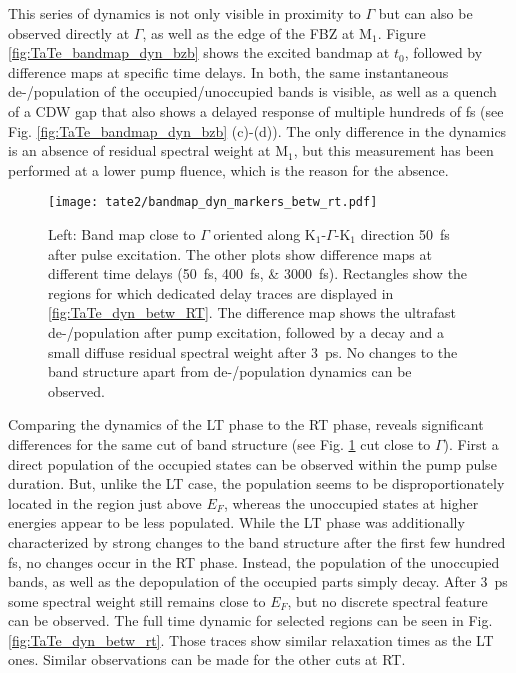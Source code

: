 This series of dynamics is not only visible in proximity to $\Gamma$ but can also be observed directly at $\Gamma$, as well as the edge of the FBZ at M$_1$.
Figure \ref{fig:TaTe_bandmap_dyn_bzb} shows the excited bandmap at $t_0$, followed by difference maps at specific time delays.
In both, the same instantaneous de-/population of the occupied/unoccupied bands is visible, as well as a quench of a CDW gap that also shows a delayed response of multiple hundreds of \si{\femto\second} (see Fig. \ref{fig:TaTe_bandmap_dyn_bzb} (c)-(d)).
The only difference in the dynamics is an absence of residual spectral weight at M$_1$, but this measurement has been performed at a lower pump fluence, which is the reason for the absence.

\begin{figure}[t!]
	\centering
	\texttt{[image: tate2/bandmap\_dyn\_markers\_betw\_rt.pdf]}
	\caption{Left: Band map close to $\Gamma$ oriented along K$_1$-$\Gamma$-K$_1$ direction \SI{50}{\femto\second} after pulse excitation. The other plots show difference maps at different time delays (\SIlist{50;400;3000}{\femto\second}). Rectangles show the regions for which dedicated delay traces are displayed in \ref{fig:TaTe_dyn_betw_RT}. The difference map shows the ultrafast de-/population after pump excitation, followed by a decay and a small diffuse residual spectral weight after \SI{3}{\pico\second}. No changes to the band structure apart from de-/population dynamics can be observed.}
	\label{fig:TaTe_bandmap_dyn_betw_rt}
\end{figure}

Comparing the dynamics of the LT phase to the RT phase, reveals significant differences for the same cut of band structure (see Fig. \ref{fig:TaTe_bandmap_dyn_betw_rt} cut close to $\Gamma$).
First a direct population of the occupied states can be observed within the pump pulse duration.
But, unlike the LT case, the population seems to be disproportionately located in the region just above $E_F$, whereas the unoccupied states at higher energies appear to be less populated.
While the LT phase was additionally characterized by strong changes to the band structure after the first few hundred \si{\femto\second}, no changes occur in the RT phase.
Instead, the population of the unoccupied bands, as well as the depopulation of the occupied parts simply decay.
After \SI{3}{\pico\second} some spectral weight still remains close to $E_F$, but no discrete spectral feature can be observed.
The full time dynamic for selected regions can be seen in Fig. \ref{fig:TaTe_dyn_betw_rt}.
Those traces show similar relaxation times as the LT ones.
Similar observations can be made for the other cuts at RT.

